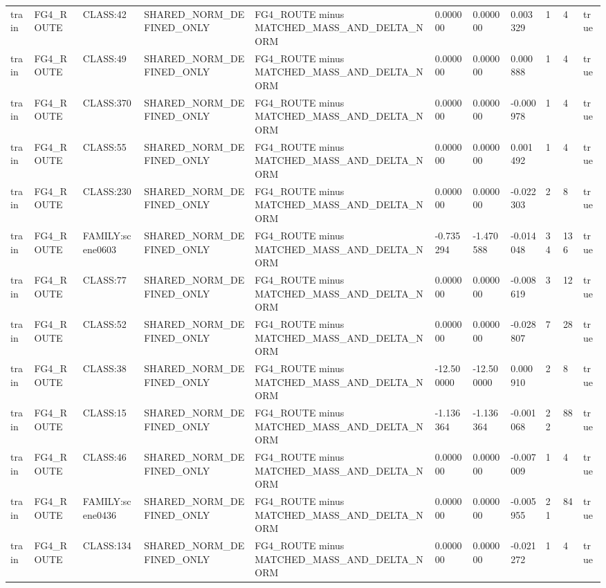 \begin{tabular}{lllllllllll}
train & FG4\_ROUTE & CLASS:42 & SHARED\_NORM\_DEFINED\_ONLY & FG4\_ROUTE minus MATCHED\_MASS\_AND\_DELTA\_NORM & 0.000000 & 0.000000 & 0.003329 & 1 & 4 & true \\
train & FG4\_ROUTE & CLASS:49 & SHARED\_NORM\_DEFINED\_ONLY & FG4\_ROUTE minus MATCHED\_MASS\_AND\_DELTA\_NORM & 0.000000 & 0.000000 & 0.000888 & 1 & 4 & true \\
train & FG4\_ROUTE & CLASS:370 & SHARED\_NORM\_DEFINED\_ONLY & FG4\_ROUTE minus MATCHED\_MASS\_AND\_DELTA\_NORM & 0.000000 & 0.000000 & -0.000978 & 1 & 4 & true \\
train & FG4\_ROUTE & CLASS:55 & SHARED\_NORM\_DEFINED\_ONLY & FG4\_ROUTE minus MATCHED\_MASS\_AND\_DELTA\_NORM & 0.000000 & 0.000000 & 0.001492 & 1 & 4 & true \\
train & FG4\_ROUTE & CLASS:230 & SHARED\_NORM\_DEFINED\_ONLY & FG4\_ROUTE minus MATCHED\_MASS\_AND\_DELTA\_NORM & 0.000000 & 0.000000 & -0.022303 & 2 & 8 & true \\
train & FG4\_ROUTE & FAMILY:scene0603 & SHARED\_NORM\_DEFINED\_ONLY & FG4\_ROUTE minus MATCHED\_MASS\_AND\_DELTA\_NORM & -0.735294 & -1.470588 & -0.014048 & 34 & 136 & true \\
train & FG4\_ROUTE & CLASS:77 & SHARED\_NORM\_DEFINED\_ONLY & FG4\_ROUTE minus MATCHED\_MASS\_AND\_DELTA\_NORM & 0.000000 & 0.000000 & -0.008619 & 3 & 12 & true \\
train & FG4\_ROUTE & CLASS:52 & SHARED\_NORM\_DEFINED\_ONLY & FG4\_ROUTE minus MATCHED\_MASS\_AND\_DELTA\_NORM & 0.000000 & 0.000000 & -0.028807 & 7 & 28 & true \\
train & FG4\_ROUTE & CLASS:38 & SHARED\_NORM\_DEFINED\_ONLY & FG4\_ROUTE minus MATCHED\_MASS\_AND\_DELTA\_NORM & -12.500000 & -12.500000 & 0.000910 & 2 & 8 & true \\
train & FG4\_ROUTE & CLASS:15 & SHARED\_NORM\_DEFINED\_ONLY & FG4\_ROUTE minus MATCHED\_MASS\_AND\_DELTA\_NORM & -1.136364 & -1.136364 & -0.001068 & 22 & 88 & true \\
train & FG4\_ROUTE & CLASS:46 & SHARED\_NORM\_DEFINED\_ONLY & FG4\_ROUTE minus MATCHED\_MASS\_AND\_DELTA\_NORM & 0.000000 & 0.000000 & -0.007009 & 1 & 4 & true \\
train & FG4\_ROUTE & FAMILY:scene0436 & SHARED\_NORM\_DEFINED\_ONLY & FG4\_ROUTE minus MATCHED\_MASS\_AND\_DELTA\_NORM & 0.000000 & 0.000000 & -0.005955 & 21 & 84 & true \\
train & FG4\_ROUTE & CLASS:134 & SHARED\_NORM\_DEFINED\_ONLY & FG4\_ROUTE minus MATCHED\_MASS\_AND\_DELTA\_NORM & 0.000000 & 0.000000 & -0.021272 & 1 & 4 & true \\

\end{tabular}
